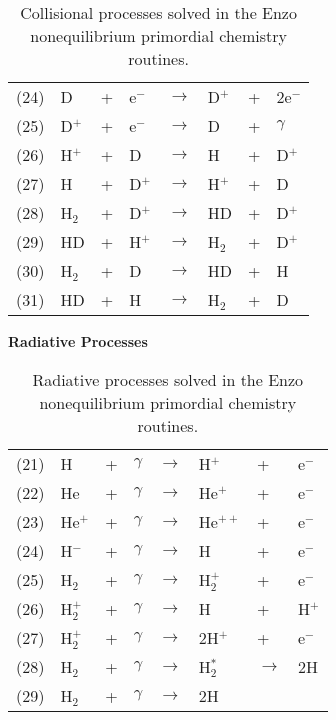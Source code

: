 \begin{table}
\begin{center}
\begin{tabular}{llllllll}
\hline
(24) & D & + & e$^-$ & $\rightarrow$ & D$^+$ &+& 2e$^-$ \\
(25) & D$^+$ &+ &e$^-$ & $\rightarrow$ & D &+ &$\gamma$ \\
(26) & H$^+$ &+ &D & $\rightarrow$ & H &+ &D$^+$ \\
(27) & H &+ &D$^+$ & $\rightarrow$ & H$^+$ &+ &D \\
(28) & H$_2$ &+ &D$^+$ & $\rightarrow$ & HD &+ &D$^+$ \\
(29) & HD &+ &H$^+$ & $\rightarrow$ & H$_2$ &+ &D$^+$ \\
(30) & H$_2$ &+ &D & $\rightarrow$ & HD &+ &H \\
(31) & HD &+ &H & $\rightarrow$ & H$_2$ &+ &D \\


\end{tabular}
\caption[]{Collisional processes solved in the Enzo nonequilibrium
primordial chemistry routines.}
\label{table.collisional}
\end{center}
\end{table}



\begin{table}
\begin{center}
{\bfseries Radiative Processes}\\[1ex]
\begin{tabular}{llllllll}
(21) & H & + & $\gamma$ & $\rightarrow$ & H$^+$ & + & e$^-$ \\
(22) & He & + & $\gamma$ & $\rightarrow$ & He$^+$ & + & e$^-$ \\
(23) & He$^+$ & + & $\gamma$ & $\rightarrow$ & He$^{++}$ & + & e$^-$ \\
(24) & H$^-$ & + & $\gamma$ & $\rightarrow$ & H & + & e$^-$ \\
(25) & H$_2$ & + & $\gamma$ & $\rightarrow$ & H$_2^+$ & + & e$^-$ \\
(26) & H$_2^+$ & + & $\gamma$ & $\rightarrow$ & H & + & H$^+$ \\
(27) & H$_2^+$ & + & $\gamma$ & $\rightarrow$ & 2H$^+$ & + & e$^-$ \\
(28) & H$_2$ & + & $\gamma$ & $\rightarrow$ & H$_2^*$ & $\rightarrow$ & 2H \\
(29) & H$_2$ & + & $\gamma$ & $\rightarrow$ & 2H &  & 
\end{tabular}
\caption[]{Radiative processes solved in the Enzo nonequilibrium
primordial chemistry routines. }
\label{table.radiative}
\end{center}
\end{table}
